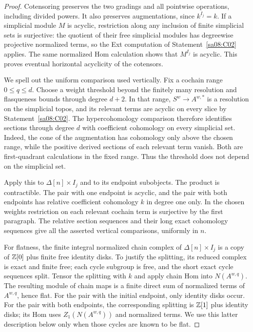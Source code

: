 \begin{proof}
Cotensoring preserves the two gradings and all pointwise operations,
including divided powers. It also preserves augmentations, since
$k^{I_j}=k$. If a simplicial module $M$ is acyclic, restriction along
any inclusion of finite simplicial sets is surjective: the quotient
of their free simplicial modules has degreewise projective normalized
terms, so the Ext computation of Statement~\ref{sa08:C02} applies.
The same normalized Hom calculation shows that $M^{I_j}$ is acyclic.
This proves eventual horizontal acyclicity of the cotensors.

We spell out the uniform comparison used vertically. Fix a cochain
range $0\le q\le d$. Choose a weight threshold beyond the finitely
many resolution and flasqueness bounds through degree $d+2$.
In that range, $S^w\to A^{w,*}$ is a resolution on the simplicial
topos, and its relevant terms are acyclic on every slice by
Statement~\ref{sa08:C02}. The hypercohomology comparison therefore
identifies sections through degree $d$ with coefficient cohomology
on every simplicial set. Indeed, the cone of the augmentation has
cohomology only above the chosen range, while the positive derived
sections of each relevant term vanish. Both are first-quadrant
calculations in the fixed range. Thus the threshold does not depend
on the simplicial set.

Apply this to $\Delta[n]\times I_j$ and to its endpoint subobjects.
The product is contractible. The pair with one endpoint is acyclic,
and the pair with both endpoints has relative coefficient cohomology
$k$ in degree one only. In the chosen weights restriction on each
relevant cochain term is surjective by the first paragraph. The
relative section sequences and their long exact cohomology sequences
give all the asserted vertical comparisons, uniformly in $n$.

For flatness, the finite integral normalized chain complex of
$\Delta[n]\times I_j$ is a copy of $\mathbb Z[0]$ plus finite free identity
disks. To justify the splitting, its reduced complex is exact and
finite free; each cycle subgroup is free, and the short exact cycle
sequences split. Tensor the splitting with $k$ and apply chain Hom
into $N(A^{w,q})$. The resulting module of chain maps is a finite
direct sum of normalized terms of $A^{w,q}$, hence flat. For the pair
with the initial endpoint, only identity disks occur. For the pair
with both endpoints, the corresponding splitting is $\mathbb Z[1]$ plus
identity disks; its Hom uses $Z_1(N(A^{w,q}))$ and normalized terms.
We use this latter description below only when those cycles are
known to be flat.


\end{proof}
